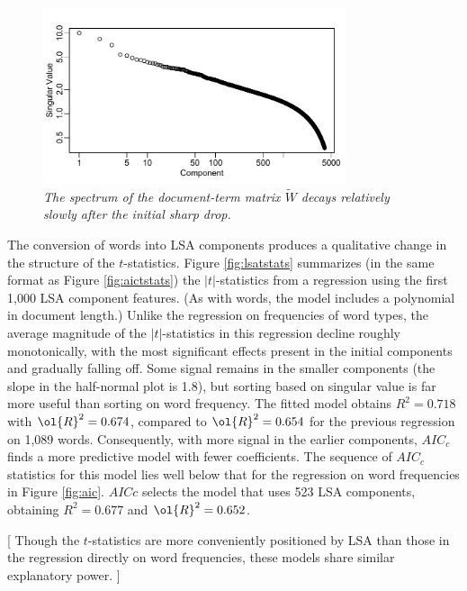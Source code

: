 \documentclass[12pt]{article}
\begin{document}
 \begin{figure}
 \caption{ 
 	\label{fig:spectrum}
	{\sl The spectrum of the document-term matrix $\tilde{W}$ decays relatively slowly 
	      after the initial sharp drop. }}

 \centerline{
 \vspace{0.1in}
 \includegraphics[width=3.5in]{figures/spectrum} }
 \vspace{0.2in}
 \end{figure}
   
The conversion of words into LSA components produces a qualitative change in the structure of the $t$-statistics.  Figure \ref{fig:lsatstats} summarizes (in the same format as Figure \ref{fig:aictstats}) the $|t|$-statistics from a regression using the first 1,000 LSA component features. (As with words, the model includes a polynomial in document length.) Unlike the regression on frequencies of word types, the average magnitude of the $|t|$-statistics in this regression decline roughly monotonically, with the most significant effects present in the initial components and gradually falling off. Some signal remains in the smaller components (the slope in the half-normal plot is 1.8), but sorting based on singular value is far more useful than sorting on word frequency.  The fitted model obtains $R^2 = 0.718$ with $\ol{R}^2 =  0.674$, compared to $\ol{R}^2 = 0.654$ for the previous regression on 1,089 words.  Consequently, with more signal in the earlier components, $AIC_c$ finds a more predictive model with fewer coefficients.  The sequence of $AIC_c$ statistics for this model lies well below that for the regression on word frequencies in Figure \ref{fig:aic}.  $AICc$ selects the model that uses 523 LSA components, obtaining $R^2 = 0.677$ and $\ol{R}^2  = 0.652$.  

[ Though the $t$-statistics are more conveniently positioned by LSA than those in the regression directly on word frequencies, these models share similar explanatory power.  ]
 
\end{document}
